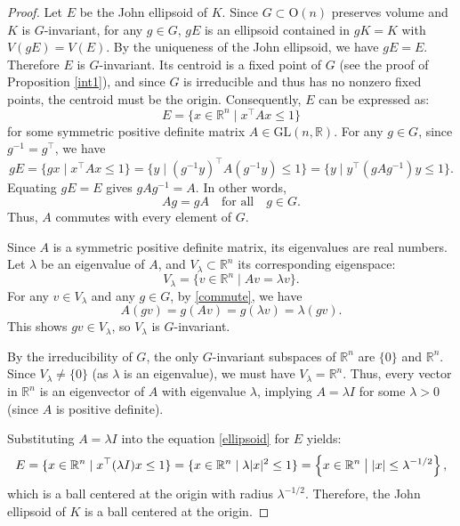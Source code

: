 \documentclass[12pt, reqno]{amsart}
\theoremstyle{definition}
\theoremstyle{remark}
\numberwithin{equation}{section}
\newcommand{\R}{\mathbb{R}}
\newcommand{\Rn}{\mathbb{R}^{n}}
\newcommand{\On}{\mathrm{O}(n)}
\begin{document}
\begin{proof}
	Let $E$ be the John ellipsoid of $K$.
	Since $G \subset \On$ preserves volume and $K$ is $G$-invariant, 	for any $g \in G $,  $gE$ is  an ellipsoid contained in $gK = K$ with $V(gE) = V(E)$. By the uniqueness of the John ellipsoid, we  have $gE = E$. Therefore $E$ is $G$-invariant. Its centroid is a fixed point of $G$ (see the proof of Proposition \ref{int1}), and since $G$ is irreducible and thus has no nonzero fixed points, the centroid must be the origin.
	Consequently, $E$ can be expressed as:  
	\begin{equation}\label{ellipsoid}
		E = \{ x \in \Rn \mid x^\top A x \leq 1 \}
	\end{equation}
	for some symmetric positive definite matrix $A \in \mathrm{GL}(n, \R)$. For any $g\in G$,  since $g^{-1} = g^\top$, we have
	\[
	gE = \{ gx \mid x^\top A x \leq 1 \} = \{ y \mid (g^{-1}y)^\top A (g^{-1}y) \leq 1 \} = \{ y \mid y^\top (gAg^{-1}) y \leq 1 \}.
	\]
	Equating $gE = E$ gives $gAg^{-1} = A$. 
	In other words, 
	\begin{equation}\label{commute}
		Ag = gA  \quad \text{for all} \quad g \in G.
	\end{equation}
	Thus, $A$ commutes with every element of $G$.
	
	
	Since $A$ is a symmetric positive definite matrix, its eigenvalues are real numbers. Let $\lambda$ be an eigenvalue of $A$, and $V_\lambda \subset \Rn$ its corresponding eigenspace:
	\[
	V_\lambda = \{ v \in \Rn \mid Av = \lambda v \}.
	\]
	For any $v \in V_\lambda$ and any $g \in G$, by \eqref{commute}, we have
	\[
	A(gv) = g(Av) = g(\lambda v) = \lambda (gv).
	\]
	This shows $gv \in V_\lambda$, so $V_\lambda$ is $G$-invariant.
	
	
	By the irreducibility of $G$, the only $G$-invariant subspaces of $\Rn$ are $\{0\}$ and $\Rn$. Since $V_\lambda \neq \{0\}$ (as $\lambda$ is an eigenvalue), we must have $V_\lambda = \Rn$. Thus, every vector in $\Rn$ is an eigenvector of $A$ with eigenvalue $\lambda$, implying $A = \lambda I$ for some $\lambda > 0$ (since $A$ is positive definite).
	
	
	Substituting $A = \lambda I$ into the equation  \eqref{ellipsoid}
	for $E$  yields:
	\[
	E = \{ x \in \Rn \mid x^\top (\lambda I) x \leq 1 \} = \{ x \in \Rn \mid \lambda |x|^2 \leq 1 \} = \left\{ x \in \Rn \bigm| |x| \leq \lambda^{-1/2} \right\},
	\]
	which is a ball centered at the origin with radius $\lambda^{-1/2}$. Therefore, the John ellipsoid of $K$ is a ball centered at the origin.
\end{proof}
\end{document}
